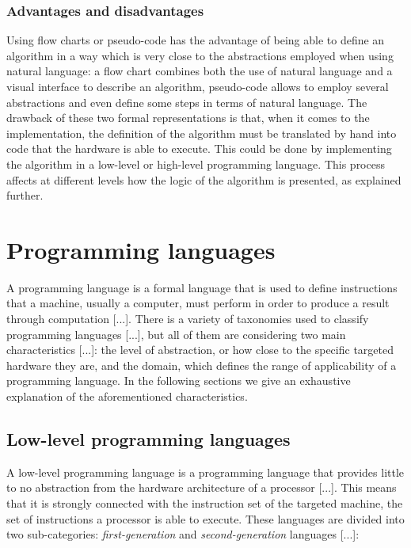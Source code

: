 \subsubsection*{Advantages and disadvantages}
Using flow charts or pseudo-code has the advantage of being able to define an algorithm in a way which is very close to the abstractions employed when using natural language: a flow chart combines both the use of natural language and a visual interface to describe an algorithm, pseudo-code allows to employ several abstractions and even define some steps in terms of natural language. The drawback of these two formal representations is that, when it comes to the implementation, the definition of the algorithm must be translated by hand into code that the hardware is able to execute. This could be done by implementing the algorithm in a low-level or high-level programming language. This process affects at different levels how the logic of the algorithm is presented, as explained further.

\section{Programming languages}
\label{sec:ch1_programming_languages}
A programming language is a formal language that is used to define instructions that a machine, usually a computer, must perform in order to produce a result through computation [...]. There is a variety of taxonomies used to classify programming languages [...], but all of them are considering two main characteristics [...]: the level of abstraction, or how close to the specific targeted hardware they are, and the domain, which defines the range of applicability of a programming language. In the following sections we give an exhaustive explanation of the aforementioned characteristics.

\subsection{Low-level programming languages}
\label{subsec:ch1_ll_languages}
A low-level programming language is a programming language that provides little to no abstraction from the hardware architecture of a processor [...]. This means that it is strongly connected with the instruction set of the targeted machine, the set of instructions a processor is able to execute. These languages are divided into two sub-categories: \textit{first-generation} and \textit{second-generation} languages [...]:

